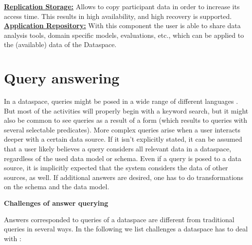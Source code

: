 \uline{\textbf{Replication Storage:}} Allows to copy participant data in order to increase its access time. This results in high availability, and high recovery is supported.\\

\uline{\textbf{Application Repository:}} With this component the user is able to share data analysis tools, domain specific models, evaluations, etc., which can be applied to the (available) data of the Dataspace.\\


\section{Query answering}

In a dataspace, queries might be posed in a wide range of different languages \cite[p. 3]{Halevy:2006:PDS:1142351.1142352}. But most of the activities will properly begin with a keyword search, but it might also be common to see queries as a result of a form (which results to queries with several selectable predicates). More complex queries arise when a user interacts deeper with a certain data source. 
If it isn't explicitly stated, it can be assumed that a user likely believes a query considers all relevant data in a dataspace, regardless of the used data model or schema. Even if a query is posed to a data source, it is implicitly expected that the system considers the data of other sources, as well. If additional answers are desired, one has to do transformations on the schema and the data model.

\textbf{Challenges of answer querying}

Answers corresponded to queries of a dataspace are different from traditional queries in several ways. In the following we list challenges a dataspace has to deal with \cite[p. 3-4]{Halevy:2006:PDS:1142351.1142352}:

